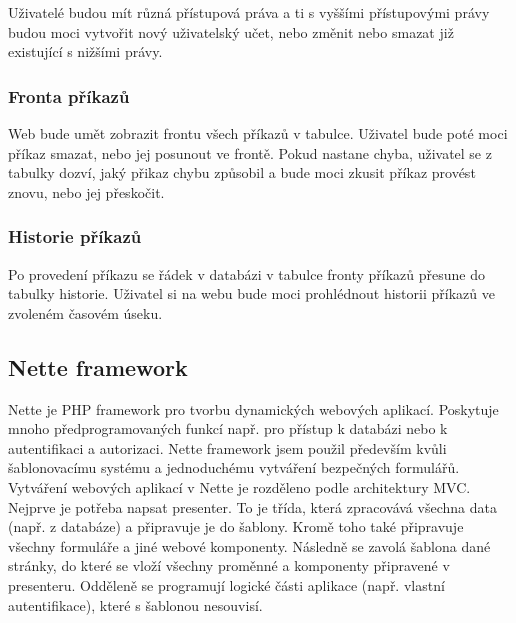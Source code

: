 \documentclass[12pt, a4paper, oneside]{article}
\begin{document}
Uživatelé budou mít různá přístupová práva a ti s vyššími přístupovými právy budou moci vytvořit nový uživatelský učet, nebo změnit nebo smazat již existující s nižšími právy.

\subsubsection{Fronta příkazů}

Web bude umět zobrazit frontu všech příkazů v tabulce. Uživatel bude poté moci příkaz smazat, nebo jej posunout ve frontě. Pokud nastane chyba, uživatel se z tabulky dozví, jaký přikaz chybu způsobil a bude moci zkusit příkaz provést znovu,
nebo jej přeskočit.

\subsubsection{Historie příkazů}

Po provedení příkazu se řádek v databázi v tabulce fronty příkazů přesune do tabulky historie. Uživatel si na webu bude moci prohlédnout historii příkazů ve zvoleném časovém úseku.

\subsection{Nette framework}

Nette je PHP framework pro tvorbu dynamických webových aplikací. Poskytuje mnoho předprogramovaných funkcí např. pro přístup k databázi nebo k autentifikaci a autorizaci.
Nette framework jsem použil především kvůli šablonovacímu systému a jednoduchému vytváření bezpečných formulářů. Vytváření webových aplikací v Nette je rozděleno podle architektury MVC. Nejprve je potřeba napsat presenter. To je třída, která zpracovává všechna data (např. z databáze) a připravuje je do šablony. Kromě toho také připravuje všechny formuláře a jiné webové komponenty. Následně se zavolá šablona dané stránky, do které se vloží všechny proměnné a komponenty připravené v presenteru. Odděleně se programují logické části aplikace (např. vlastní autentifikace), které s šablonou nesouvisí.
\end{document}

